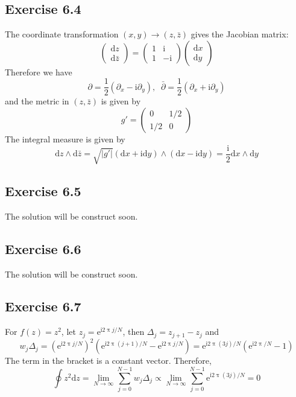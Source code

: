 \documentclass[]{ctexart}
\begin{document}
	\subsection{Exercise 6.4}
	The coordinate transformation $(x,y)\to(z,\bar z)$ gives the Jacobian matrix: 
	\begin{equation*}
	\begin{pmatrix}
	\mathrm{d}z\\\mathrm{d}\bar z
	\end{pmatrix}=\begin{pmatrix}
	1 & \mathrm{i} \\ 1 & -\mathrm{i}
	\end{pmatrix}\begin{pmatrix}
	\mathrm{d}x \\ \mathrm{d}y
	\end{pmatrix}
	\end{equation*}
	Therefore we have 
	\begin{equation*}
	\partial=\frac 12(\partial_x-\mathrm{i}\partial_y),\;\;\bar\partial=\frac 12(\partial_x+\mathrm{i}\partial_y)
	\end{equation*}
	and the metric in $(z,\bar z)$ is given by 
	\begin{equation*}
	g'=\begin{pmatrix}
	0 & 1/2\\
	1/2 & 0
	\end{pmatrix}
	\end{equation*}
	The integral measure is given by 
	\begin{equation*}
	\mathrm{d}z\wedge\mathrm{d}\bar z=\sqrt{|g'|}(\mathrm{d}x+\mathrm{i}\mathrm{d}y)\wedge(\mathrm{d}x-\mathrm{i}\mathrm{d}y)=\frac{\mathrm{i}}{2}\mathrm{d}x\wedge\mathrm{d}y
	\end{equation*}
	\subsection{Exercise 6.5}
	The solution will be construct soon. 
	\subsection{Exercise 6.6}
	The solution will be construct soon. 
	\subsection{Exercise 6.7}
	For $f(z)=z^2$, let $z_j=\mathrm{e}^{\mathrm{i}2\uppi j/N}$, then $\Delta_j=z_{j+1}-z_j$ and 
	\begin{equation*}
	w_j\Delta_j=(\mathrm{e}^{\mathrm{i}2\uppi j/N})^2(\mathrm{e}^{\mathrm{i}2\uppi (j+1)/N}-\mathrm{e}^{\mathrm{i}2\uppi j/N})=\mathrm{e}^{\mathrm{i}2\uppi(3j)/N}(\mathrm{e}^{\mathrm{i}2\uppi/N}-1)
	\end{equation*}
	The term in the bracket is a constant vector. Therefore, 
	\begin{equation*}
	\oint z^2\mathrm{d}z=\lim_{N\to\infty}\sum_{j=0}^{N-1}w_j\Delta_j\propto\lim_{N\to\infty}\sum_{j=0}^{N-1}\mathrm{e}^{\mathrm{i}2\uppi (3j)/N}=0
	\end{equation*}
\end{document}
